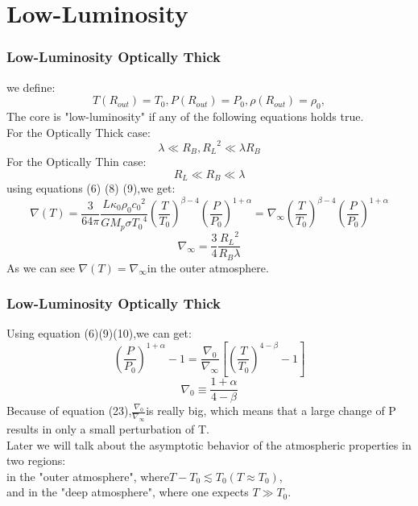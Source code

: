 \documentclass{beamer}
\begin{document}
\section{Low-Luminosity}
\begin{frame}
\frametitle{Low-Luminosity Optically Thick}
we define:
\begin{equation}
T(R_{out})=T_0,P(R_{out})=P_0,\rho(R_{out})=\rho_0,
\end{equation}
The core is "low-luminosity" if any of the following equations holds true.\\
For the Optically Thick case:
\begin{equation}
\lambda \ll R_B , {R_L}^2 \ll \lambda R_B
\end{equation}
For the Optically Thin case:
\begin{equation}
R_L \ll R_B \ll \lambda
\end{equation}
using equations (6) (8) (9),we get:
\begin{equation}
\nabla(T) = \frac{3}{64\pi} \frac{L\kappa_0 \rho_0 {c_0}^2}{GM_p\sigma {T_0}^4} {(\frac{T}{T_0})}^{\beta-4} {(\frac{P}{P_0})}^{1+\alpha}=\nabla_{\infty}{(\frac{T}{T_0})}^{\beta-4} {(\frac{P}{P_0})}^{1+\alpha}
\end{equation}
\begin{equation}
\nabla_{\infty}=\frac{3}{4} \frac{{R_L}^2}{R_B \lambda}
\end{equation}
As we can see $\nabla(T)=\nabla_{\infty}$in the outer atmosphere.
\end{frame}

\begin{frame}
\frametitle{Low-Luminosity Optically Thick}
Using equation (6)(9)(10),we can get:
\begin{equation}
{(\frac{P}{P_0})}^{1+\alpha}-1=\frac{\nabla_0}{\nabla_\infty}[{(\frac{T}{T_0})}^{4-\beta}-1]
\end{equation}
\begin{equation}
\nabla_0 \equiv \frac{1+\alpha}{4-\beta}
\end{equation}
Because of equation (23),$\frac{\nabla_0}{\nabla_\infty}$is really big, which means that a large change of P results in only a small perturbation of T.\\
Later we will talk about the asymptotic behavior of the atmospheric properties in two regions: \\
in the "outer atmosphere", where$ T-T_0\lesssim T_0(T \approx T_0)$, \\
and in the "deep atmosphere", where one expects $T \gg T_0$.
\end{frame}
\end{document}
